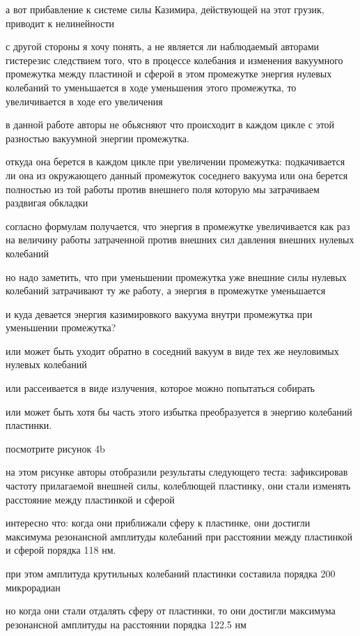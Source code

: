 \documentclass[12pt, letterpaper]{article}
\begin{document}
а вот прибавление к системе силы Казимира, действующей на этот грузик, приводит к нелинейности

с другой стороны я хочу понять, а не является ли наблюдаемый авторами гистерезис следствием того, что в процессе колебания и изменения вакуумного промежутка между пластиной и сферой в этом промежутке энергия нулевых колебаний то уменьшается в ходе уменьшения этого промежутка, то увеличивается в ходе его увеличения

в данной работе авторы не обьясняют что происходит в каждом цикле с этой разностью вакуумной энергии промежутка.

откуда она берется в каждом цикле при увеличении промежутка: подкачивается ли она из окружающего данный промежуток соседнего вакуума или она берется полностью из той работы против внешнего поля которую мы затрачиваем раздвигая обкладки

согласно формулам получается, что энергия в промежутке увеличивается как раз на величину работы затраченной против внешних сил давления внешних нулевых колебаний

но надо заметить, что при уменьшении промежутка уже внешние силы нулевых колебаний затрачивают ту же работу, а энергия в промежутке уменьшается

и куда девается энергия казимировкого вакуума внутри промежутка при уменьшении промежутка?

или может быть уходит обратно в соседний вакуум в виде тех же неуловимых нулевых колебаний

или рассеивается в виде излучения, которое можно попытаться собирать

или может быть хотя бы часть этого избытка преобразуется в энергию колебаний пластинки.

посмотрите рисунок 4b

на этом рисунке авторы отобразили результаты следующего теста: зафиксировав частоту прилагаемой внешней силы, колеблющей пластинку, они стали изменять расстояние между пластинкой и сферой

интересно что: когда они приближали сферу к пластинке, они достигли максимума резонансной амплитуды колебаний при расстоянии между пластинкой и сферой порядка 118 нм.

при этом амплитуда крутильных колебаний пластинки составила порядка 200 микрорадиан

но когда они стали отдалять сферу от пластинки, то они достигли максимума резонансной амплитуды на расстоянии порядка 122.5 нм
\end{document}
